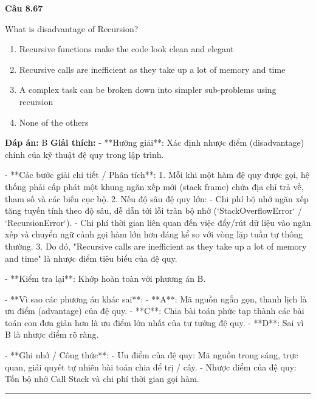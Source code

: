 \documentclass[11pt,a4paper]{article}
\newenvironment{question}[1]{%
  \par\vspace{1em}\noindent\textbf{\large Câu #1}\par\vspace{0.4em}
}{%
  \par\vspace{1em}\hrule\vspace{0.6em}
}
\newenvironment{choices}{%
  \begin{enumerate}[label=\textbf{\Alph*.},leftmargin=2.2em,itemsep=2pt,topsep=3pt]
}{%
  \end{enumerate}
}
\newcommand{\choice}{\item}
\begin{document}
\begin{question}{8.67}
What is disadvantage of Recursion?
\begin{choices}
\choice Recursive functions make the code look clean and elegant
\choice Recursive calls are inefficient as they take up a lot of memory and time
\choice A complex task can be broken down into simpler sub-problems using recursion
\choice None of the others
\end{choices}
\textbf{Đáp án:} B
\textbf{Giải thích:} - **Hướng giải**:
  Xác định nhược điểm (disadvantage) chính của kỹ thuật đệ quy trong lập trình.

- **Các bước giải chi tiết / Phân tích**:
  1. Mỗi khi một hàm đệ quy được gọi, hệ thống phải cấp phát một khung ngăn xếp mới (stack frame) chứa địa chỉ trả về, tham số và các biến cục bộ.
  2. Nếu độ sâu đệ quy lớn:
     - Chi phí bộ nhớ ngăn xếp tăng tuyến tính theo độ sâu, dễ dẫn tới lỗi tràn bộ nhớ (`StackOverflowError` / `RecursionError`).
     - Chi phí thời gian liên quan đến việc đẩy/rút dữ liệu vào ngăn xếp và chuyển ngữ cảnh gọi hàm lớn hơn đáng kể so với vòng lặp tuần tự thông thường.
  3. Do đó, "Recursive calls are inefficient as they take up a lot of memory and time" là nhược điểm tiêu biểu của đệ quy.

- **Kiểm tra lại**:
  Khớp hoàn toàn với phương án B.

- **Vì sao các phương án khác sai**:
  - **A**: Mã nguồn ngắn gọn, thanh lịch là ưu điểm (advantage) của đệ quy.
  - **C**: Chia bài toán phức tạp thành các bài toán con đơn giản hơn là ưu điểm lớn nhất của tư tưởng đệ quy.
  - **D**: Sai vì B là nhược điểm rõ ràng.

- **Ghi nhớ / Công thức**:
  - Ưu điểm của đệ quy: Mã nguồn trong sáng, trực quan, giải quyết tự nhiên bài toán chia để trị / cây.
  - Nhược điểm của đệ quy: Tốn bộ nhớ Call Stack và chi phí thời gian gọi hàm.
\end{question}
\end{document}
